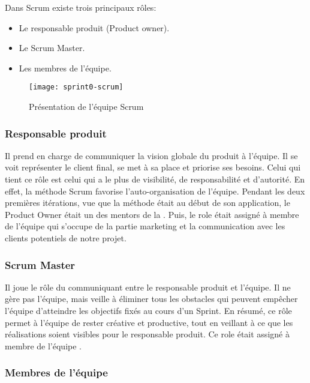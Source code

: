 Dans Scrum existe trois principaux rôles:

\begin{itemize}
    \item Le responsable produit (Product owner).
    \item Le Scrum Master.
    \item Les membres de l'équipe.
\end{itemize}

\begin{figure}[!h]
    \centering
    \texttt{[image: sprint0-scrum]}
    \caption{Présentation de l'équipe Scrum}
    \label{fig:sprint0-scrum}
\end{figure}

\subsubsection{Responsable produit }

Il prend en charge de communiquer la vision globale du produit à l'équipe. Il
se voit représenter le client final, se met à sa place et priorise ses besoins.
Celui qui tient ce rôle est celui qui a le plus de visibilité, de
responsabilité et d'autorité. En effet, la méthode Scrum favorise
l'auto-organisation de l'équipe. Pendant les deux premières itérations, vue que
la méthode était au début de son application, le Product Owner était un des
mentors de la . Puis, le role était assigné à membre
de l'équipe qui s'occupe de la partie marketing et la communication avec les
clients potentiels de notre projet.

\subsubsection{Scrum Master}

Il joue le rôle du communiquant entre le responsable produit et l'équipe. Il ne
gère pas l'équipe, mais veille à éliminer tous les obstacles qui peuvent
empêcher l'équipe d'atteindre les objectifs fixés au cours d'un Sprint. En
résumé, ce rôle permet à l'équipe de rester créative et productive, tout en
veillant à ce que les réalisations soient visibles pour le responsable produit.
Ce role était assigné à membre de l'équipe .

\subsubsection{Membres de l'équipe}

